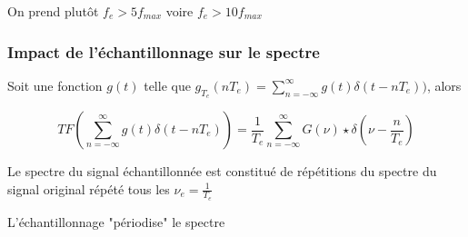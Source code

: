 \documentclass{beamer}
\begin{document}
\begin{frame}
\begin{columns}
\end{columns}

\begin{block}{}
On prend plutôt $f_e > 5 f_{max}$ voire $f_e > 10 f_ {max}$
\end{block}

\end{frame}

\begin{frame}
\frametitle{Impact de l'échantillonnage sur le spectre}

Soit une fonction $g(t)$ telle que $g_{T_e}(nT_e) = \sum_{n = -\infty}^{\infty} g(t)\delta(t-nT_e))$, alors \\

\vspace{1cm} 

\[ TF (\sum_{n = -\infty}^{\infty} g(t)\delta(t-nT_e)) = \frac{1}{T_e}\sum_{n = -\infty}^{\infty} G(\nu) \star \delta(\nu - \frac{n}{T_e}) \] 

\vspace{0.5cm}

\begin{block}{}
Le spectre du signal échantillonnée est constitué de répétitions du spectre du signal original répété tous les $\nu_e = \frac{1}{T_e}$
\end{block}
L'échantillonnage "périodise" le spectre

\end{frame}
\end{document}
